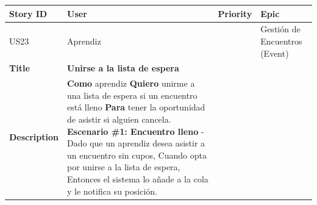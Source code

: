 {\def\LTcaptype{none} %
\begin{longtable}[]{@{}
  >{\raggedright\arraybackslash}p{}
  >{\raggedright\arraybackslash}p{}
  >{\raggedright\arraybackslash}p{}
  >{\raggedright\arraybackslash}p{}@{}}
\toprule\noalign{}
\begin{minipage}[b]{\linewidth}\raggedright
Story ID
\end{minipage} & \begin{minipage}[b]{\linewidth}\raggedright
User
\end{minipage} & \begin{minipage}[b]{\linewidth}\raggedright
Priority
\end{minipage} & \begin{minipage}[b]{\linewidth}\raggedright
Epic
\end{minipage} \\
\midrule\noalign{}
\endhead
\bottomrule\noalign{}
\endlastfoot
US23 & Aprendiz & 3 & Gestión de Encuentros (Event) \\
\textbf{Title} & \textbf{Unirse a la lista de espera} & & \\
\textbf{Description} & \textbf{Como} aprendiz \textbf{Quiero} unirme a
una lista de espera si un encuentro está lleno \textbf{Para} tener la
oportunidad de asistir si alguien cancela. \textbf{Escenario \#1:
Encuentro lleno} - Dado que un aprendiz desea asistir a un encuentro sin
cupos, Cuando opta por unirse a la lista de espera, Entonces el sistema
lo añade a la cola y le notifica su posición. & & \\
\end{longtable}
}

